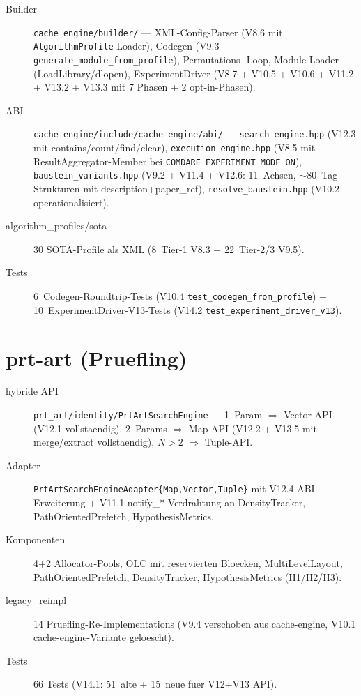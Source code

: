 \begin{description}
    \item[Builder] \texttt{cache\_engine/builder/} — XML-Config-Parser
          (V8.6 mit \texttt{AlgorithmProfile}-Loader), Codegen
          (V9.3 \texttt{generate\_module\_from\_profile}), Permutations-
          Loop, Module-Loader (LoadLibrary/dlopen), ExperimentDriver
          (V8.7 + V10.5 + V10.6 + V11.2 + V13.2 + V13.3 mit
          7 Phasen + 2 opt-in-Phasen).
    \item[ABI] \texttt{cache\_engine/include/cache\_engine/abi/} —
          \texttt{search\_engine.hpp} (V12.3 mit contains/count/find/clear),
          \texttt{execution\_engine.hpp} (V8.5 mit ResultAggregator-Member
          bei \texttt{COMDARE\_EXPERIMENT\_MODE\_ON}),
          \texttt{baustein\_variants.hpp} (V9.2 + V11.4 + V12.6: 11~Achsen,
          $\sim$80~Tag-Strukturen mit description+paper\_ref),
          \texttt{resolve\_baustein.hpp} (V10.2 operationalisiert).
    \item[algorithm\_profiles/sota] 30 SOTA-Profile als XML
          (8~Tier-1 V8.3 + 22~Tier-2/3 V9.5).
    \item[Tests] 6~Codegen-Roundtrip-Tests (V10.4 \texttt{test\_codegen\_from\_profile})
          + 10~ExperimentDriver-V13-Tests (V14.2
          \texttt{test\_experiment\_driver\_v13}).
\end{description}

\section{prt-art (Pruefling)}

\begin{description}
    \item[hybride API] \texttt{prt\_art/identity/PrtArtSearchEngine} —
          1~Param $\Rightarrow$ Vector-API (V12.1 vollstaendig), 2~Params
          $\Rightarrow$ Map-API (V12.2 + V13.5 mit merge/extract
          vollstaendig), $N>2$ $\Rightarrow$ Tuple-API.
    \item[Adapter] \texttt{PrtArtSearchEngineAdapter\{Map,Vector,Tuple\}}
          mit V12.4 ABI-Erweiterung + V11.1 notify\_*-Verdrahtung an
          DensityTracker, PathOrientedPrefetch, HypothesisMetrics.
    \item[Komponenten] 4+2 Allocator-Pools, OLC mit reservierten Bloecken,
          MultiLevelLayout, PathOrientedPrefetch, DensityTracker,
          HypothesisMetrics (H1/H2/H3).
    \item[legacy\_reimpl] 14 Pruefling-Re-Implementations
          (V9.4 verschoben aus cache-engine, V10.1 cache-engine-Variante geloescht).
    \item[Tests] 66 Tests (V14.1: 51~alte + 15~neue fuer V12+V13 API).
\end{description}

